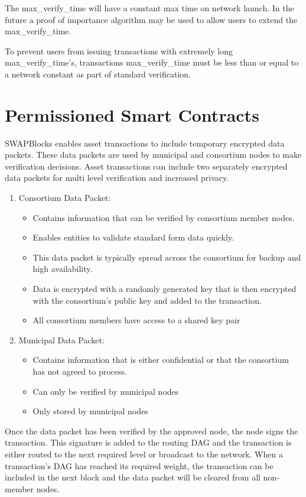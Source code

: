 \documentclass[12pt]{article}
\begin{document}
The max\_verify\_time will have a constant max time on network launch.  
In the future a proof of importance algorithm may be used to 
allow users to extend the max\_verify\_time.

To prevent users from issuing transactions with extremely long max\_verify\_time's, transactions max\_verify\_time
must be less than or equal to a network constant as part of standard verification.

\section{Permissioned Smart Contracts}

SWAPBlocks enables asset transactions to include temporary encrypted data packets. These data
packets are used by municipal and consortium nodes to make verification decisions.  Asset transactions
can include two separately encrypted data packets for multi level verification and increased privacy.

\begin{enumerate}
	\item Consortium Data Packet:
		\begin{itemize}
			\item{Contains information that can be verified by consortium member
				nodes.}
			\item{Enables entities to validate standard form data quickly.} 
			\item{This data packet is typically spread across the consortium for backup
				and high availability.}
			\item{Data is encrypted with a randomly generated key that is then encrypted
				with the consortium's public key and added to the transaction.}
			\item{All consortium members have access to a shared key pair}	
		\end{itemize}
	\item Municipal Data Packet:
		\begin{itemize}
			\item{Contains information that is either confidential or that the
				consortium has not agreed to process.}
			\item{Can only be verified by municipal nodes}
			\item{Only stored by municipal nodes}
		\end{itemize}
\end{enumerate}

Once the data packet has been verified by the approved node, the node signs the 
transaction. This signature is added to the routing DAG and the transaction is either routed
		to the next required level or broadcast to the network.
When a transaction's DAG has reached 
its required weight, the transaction can be included in the next block and the data
		packet will be cleared from all non-member nodes.
\end{document}
